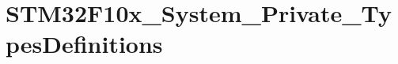 \hypertarget{group___s_t_m32_f10x___system___private___types_definitions}{\section{S\-T\-M32\-F10x\-\_\-\-System\-\_\-\-Private\-\_\-\-Types\-Definitions}
\label{group___s_t_m32_f10x___system___private___types_definitions}
}
